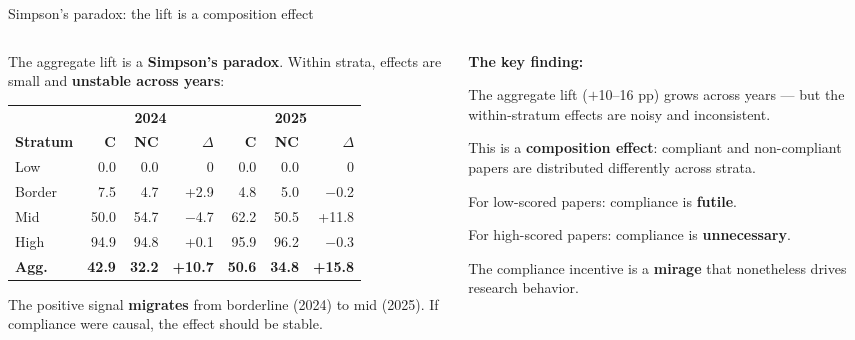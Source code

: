 \documentclass[aspectratio=169,11pt]{beamer}
\begin{document}
\begin{frame}[label=simpson]{Simpson's paradox: the lift is a composition effect}
\begin{columns}[T]
\begin{column}{0.55\textwidth}
{\small The aggregate lift is a \textbf{Simpson's paradox}. Within strata, effects are small and \textbf{unstable across years}:}

\vspace{0.3em}

{\scriptsize
\begin{tabular}{lrrr|rrr}
\toprule
& \multicolumn{3}{c|}{\textbf{2024}} & \multicolumn{3}{c}{\textbf{2025}} \\
\textbf{Stratum} & \textbf{C} & \textbf{NC} & \textbf{$\Delta$} & \textbf{C} & \textbf{NC} & \textbf{$\Delta$} \\
\midrule
Low & 0.0 & 0.0 & 0 & 0.0 & 0.0 & 0 \\
Border & 7.5 & 4.7 & \textcolor{pass}{+2.9} & 4.8 & 5.0 & \textcolor{fail}{$-$0.2} \\
Mid & 50.0 & 54.7 & \textcolor{fail}{$-$4.7} & 62.2 & 50.5 & \textcolor{pass}{+11.8} \\
High & 94.9 & 94.8 & +0.1 & 95.9 & 96.2 & $-$0.3 \\
\midrule
\textbf{Agg.} & \textbf{42.9} & \textbf{32.2} & \textbf{+10.7} & \textbf{50.6} & \textbf{34.8} & \textbf{+15.8} \\
\bottomrule
\end{tabular}
}

\vspace{0.3em}
{\small The positive signal \textbf{migrates} from borderline (2024) to mid (2025). If compliance were causal, the effect should be stable.}
\end{column}
\begin{column}{0.42\textwidth}
\vspace{0.5em}

{\small \textbf{The key finding:}}

\vspace{0.3em}
{\small The aggregate lift ($+$10--16 pp) grows across years --- but the within-stratum effects are noisy and inconsistent.}

\vspace{0.5em}
{\small This is a \textbf{composition effect}: compliant and non-compliant papers are distributed differently across strata.}

\vspace{0.5em}
{\small For low-scored papers: compliance is \textbf{futile}.}

\vspace{0.2em}
{\small For high-scored papers: compliance is \textbf{unnecessary}.}

\vspace{0.2em}
{\small The compliance incentive is a \textbf{mirage} that nonetheless drives research behavior.}
\end{column}
\end{columns}
\end{frame}
\end{document}
